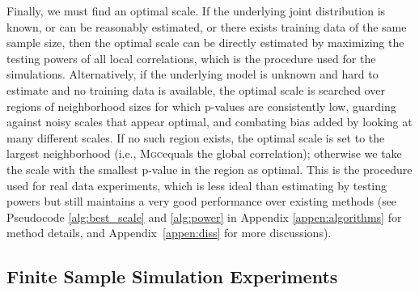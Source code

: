 \documentclass[11pt]{article}
\newcommand{\note}[2][]{\added[#1,remark={#2}]{}}
\providecommand{\sct}[1]{{\normalfont\textsc{#1}}}
\newcommand{\Mgc}{\sct{Mgc}}
\newcommand{\Mcorr}{\sct{Mcorr}}
\newcommand{\jv}[1]{{\note{jv: #1}}}
\newcommand{\cs}[1]{{\note{cs: #1}}}
\begin{document}
Finally, we must find an optimal scale. If the underlying joint distribution is known, or can be reasonably estimated, or there exists training data of the same sample size, then the optimal scale can be directly estimated by maximizing the testing powers of all local correlations, which is the procedure used for the simulations. Alternatively, if the underlying model is unknown and hard to estimate and no training data is available, the optimal scale is searched over regions of neighborhood sizes for which p-values are consistently low, guarding against noisy scales that appear optimal, and combating bias added by looking at many different scales. If no such region exists, the optimal scale is set to the largest neighborhood (i.e., \Mgc equals the global correlation); otherwise we take the scale with the smallest p-value in the region as optimal. This is the procedure used for real data experiments, which is less ideal than estimating by testing powers but still maintains a very good performance over existing methods (see Pseudocode \ref{alg:best_scale} and \ref{alg:power} in Appendix \ref{appen:algorithms} for method details, and Appendix~\ref{appen:diss} for more discussions).
\cs{clarify different between sims and real data}
\jv{tried clarification in the paragraph above}
%



\subsection*{Finite Sample Simulation Experiments}

\end{document}
